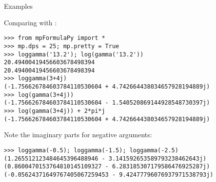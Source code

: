 Examples

Comparing with :

\begin{lstlisting}
>>> from mpFormulaPy import *
>>> mp.dps = 25; mp.pretty = True
>>> loggamma('13.2'); log(gamma('13.2'))
20.49400419456603678498394
20.49400419456603678498394
>>> loggamma(3+4j)
(-1.756626784603784110530604 + 4.742664438034657928194889j)
>>> log(gamma(3+4j))
(-1.756626784603784110530604 - 1.540520869144928548730397j)
>>> log(gamma(3+4j)) + 2*pi*j
(-1.756626784603784110530604 + 4.742664438034657928194889j)
\end{lstlisting}

Note the imaginary parts for negative arguments:

\begin{lstlisting}
>>> loggamma(-0.5); loggamma(-1.5); loggamma(-2.5)
(1.265512123484645396488946 - 3.141592653589793238462643j)
(0.8600470153764810145109327 - 6.283185307179586476925287j)
(-0.05624371649767405067259453 - 9.42477796076937971538793j)
\end{lstlisting}


